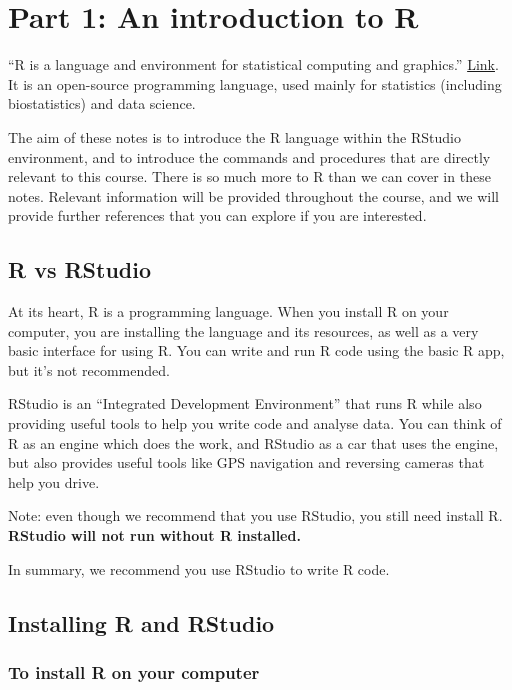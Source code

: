 \documentclass[
  a4paper,
]{memoir}
\begin{document}
\hypertarget{part-1-an-introduction-to-r}{%
\section{Part 1: An introduction to
R}\label{part-1-an-introduction-to-r}}

``R is a language and environment for statistical computing and
graphics.'' \href{https://www.r-project.org/about.html}{Link}. It is an
open-source programming language, used mainly for statistics (including
biostatistics) and data science.

The aim of these notes is to introduce the R language within the RStudio
environment, and to introduce the commands and procedures that are
directly relevant to this course. There is so much more to R than we can
cover in these notes. Relevant information will be provided throughout
the course, and we will provide further references that you can explore
if you are interested.

\hypertarget{r-vs-rstudio}{%
\subsection{R vs RStudio}\label{r-vs-rstudio}}

At its heart, R is a programming language. When you install R on your
computer, you are installing the language and its resources, as well as
a very basic interface for using R. You can write and run R code using
the basic R app, but it's not recommended.

RStudio is an ``Integrated Development Environment'' that runs R while
also providing useful tools to help you write code and analyse data. You
can think of R as an engine which does the work, and RStudio as a car
that uses the engine, but also provides useful tools like GPS navigation
and reversing cameras that help you drive.

Note: even though we recommend that you use RStudio, you still need
install R. \textbf{RStudio will not run without R installed.}

In summary, we recommend you use RStudio to write R code.

\hypertarget{installing-r-and-rstudio}{%
\subsection{Installing R and RStudio}\label{installing-r-and-rstudio}}

\hypertarget{to-install-r-on-your-computer}{%
\subsubsection{To install R on your
computer}\label{to-install-r-on-your-computer}}
\end{document}
